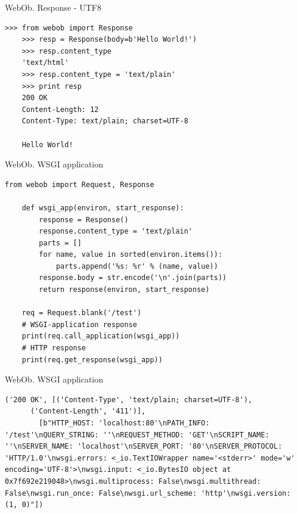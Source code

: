 \begin{frame}[fragile]{WebOb. Response - UTF8}

  \begin{lstlisting}[style=python]
    >>> from webob import Response
    >>> resp = Response(body=b'Hello World!')
    >>> resp.content_type
    'text/html'
    >>> resp.content_type = 'text/plain'
    >>> print resp
    200 OK
    Content-Length: 12
    Content-Type: text/plain; charset=UTF-8

    Hello World!
  \end{lstlisting}

\end{frame}

\begin{frame}[fragile]{WebOb. WSGI application}

  \begin{lstlisting}[style=python]
    from webob import Request, Response

    def wsgi_app(environ, start_response):
        response = Response()
        response.content_type = 'text/plain'
        parts = []
        for name, value in sorted(environ.items()):
            parts.append('%s: %r' % (name, value))
        response.body = str.encode('\n'.join(parts))
        return response(environ, start_response)

    req = Request.blank('/test')
    # WSGI-application response
    print(req.call_application(wsgi_app))
    # HTTP response
    print(req.get_response(wsgi_app))
  \end{lstlisting}

\end{frame}

\begin{frame}[fragile]{WebOb. WSGI application}

  \begin{lstlisting}[style=python]
    ('200 OK', [('Content-Type', 'text/plain; charset=UTF-8'),
      ('Content-Length', '411')],
        [b"HTTP_HOST: 'localhost:80'\nPATH_INFO: '/test'\nQUERY_STRING: ''\nREQUEST_METHOD: 'GET'\nSCRIPT_NAME: ''\nSERVER_NAME: 'localhost'\nSERVER_PORT: '80'\nSERVER_PROTOCOL: 'HTTP/1.0'\nwsgi.errors: <_io.TextIOWrapper name='<stderr>' mode='w' encoding='UTF-8'>\nwsgi.input: <_io.BytesIO object at 0x7f692e219048>\nwsgi.multiprocess: False\nwsgi.multithread: False\nwsgi.run_once: False\nwsgi.url_scheme: 'http'\nwsgi.version: (1, 0)"])
  \end{lstlisting}

\end{frame}

